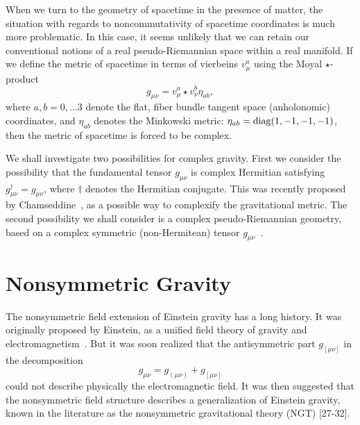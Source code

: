 \documentclass[a4paper,10pt]{article}
\begin{document}
When we turn to the geometry of spacetime in the
presence of matter, the situation with regards to noncommutativity of
spacetime coordinates is much more problematic. In this case, it seems
unlikely that we can retain our conventional notions of a real
pseudo-Riemannian space within a real manifold. If we define the metric of
spacetime in terms of vierbeins $v^a_\mu$ using the Moyal $\star$-product
\begin{equation}
g_{\mu\nu}=v^a_\mu\star v^b_\nu\eta_{ab},
\end{equation}
where $a,b= 0,...3$ denote the flat, fiber bundle tangent space
(anholonomic) coordinates, and $\eta_{ab}$ denotes the Minkowski metric:
$\eta_{ab}={\rm diag}(1, -1, -1, -1)$, then the metric of spacetime is
forced to be complex.

We shall investigate two possibilities for complex gravity.
First we consider the possibility that the fundamental tensor $g_{\mu\nu}$
is complex Hermitian satisfying $g_{\mu\nu}^\dagger=g_{\mu\nu}$, where
$\dagger$ denotes the Hermitian conjugate. This was recently proposed by
Chamseddine~\cite{Chamseddine,Majid}, as a possible way to complexify the
gravitational metric. The second possibility we shall consider is a
complex pseudo-Riemannian geometry, based on a complex symmetric
(non-Hermitean) tensor $g_{\mu\nu}$~\cite{Moffat,Moffat2,Moffat3}.

\section{Nonsymmetric Gravity}

The nonsymmetric field extension of Einstein gravity has a long history.
It was originally proposed by Einstein, as a unified field theory of gravity and
electromagnetism~\cite{Einstein,Straus}. But it was soon realized that the
antisymmetric part $g_{[\mu\nu]}$ in the decomposition
\begin{equation}
\label{nonsymmetric}
g_{\mu\nu}=g_{(\mu\nu)}+g_{[\mu\nu]}
\end{equation}
could not describe physically the electromagnetic field. It was then
suggested that the nonsymmetric field structure describes a
generalization of Einstein gravity, known in the literature as the nonsymmetric
gravitational theory
(NGT) [27-32].
\end{document}
